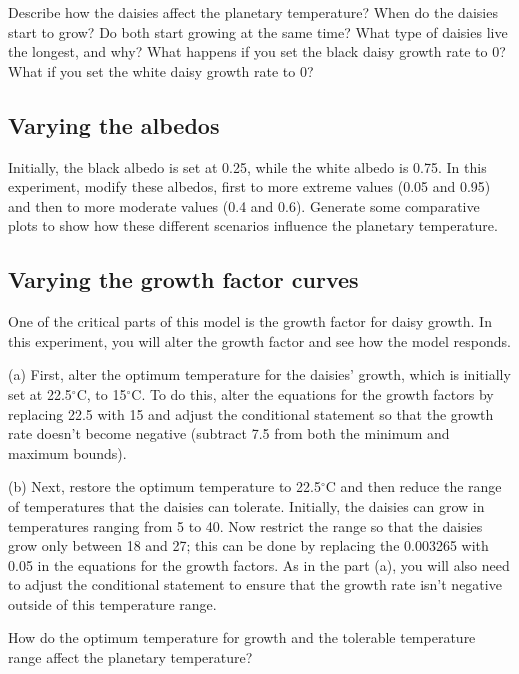 \documentclass[11pt,letterpaper]{article}
\begin{document}
Describe how the daisies affect the planetary temperature? When do the daisies start to grow? Do both start growing at the same time? What type of daisies live the longest, and why? What happens if you set the black daisy growth rate to 0? What if you set the white daisy growth rate to 0?

\subsection{Varying the albedos}
Initially, the black albedo is set at 0.25, while the white albedo is 0.75. In this experiment, modify these albedos, first to more
extreme values (0.05 and 0.95) and then to more moderate values (0.4 and 0.6). Generate some comparative plots to show how these different scenarios influence the planetary temperature.

\subsection{Varying the growth factor curves}

One of the critical parts of this model is the growth factor for daisy growth. In this experiment, you will alter the growth factor and
see how the model responds.

(a) First, alter the optimum temperature for the daisies' growth, which is initially set at 22.5$^\circ$C, to 15$^\circ$C. To do this, alter the equations for the growth factors by replacing 22.5 with 15 and adjust the conditional statement so that the growth rate doesn't become negative (subtract 7.5 from both the minimum and maximum bounds). 

(b) Next, restore the optimum temperature to 22.5$^\circ$C and then reduce the range of temperatures that the daisies can tolerate. Initially,
the daisies can grow in temperatures ranging from 5 to 40. Now restrict the range so that the daisies grow only between 18 and 27;
this can be done by replacing the 0.003265 with 0.05 in the equations for the growth factors. As in the part (a), you will also need to adjust the conditional statement to ensure that the growth rate isn't negative outside of this temperature range. 

How do the optimum temperature for growth and the tolerable temperature range affect the planetary temperature?
\end{document}
